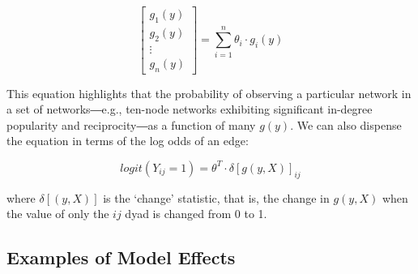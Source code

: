 \documentclass[
  letterpaper,
  DIV=11,
  numbers=noendperiod]{scrartcl}
\begin{document}
\begin{equation}
  [\theta_{1}, \theta_{2}, ..., \theta_{n}]\begin{bmatrix}
           g_{1}(y) \\
           g_{2}(y) \\
           \vdots \\
           g_{n}(y)
        \end{bmatrix}
        = \sum_{i=1}^{n} \theta_{i} \cdot g_{i}(y)
  \end{equation}

This equation highlights that the probability of observing a particular
network in a set of networks―e.g., ten-node networks exhibiting
significant in-degree popularity and reciprocity―as a function of many
\(g(y)\). We can also dispense the equation in terms of the log odds of
an edge:

\begin{equation}
logit(Y_{ij} = 1) = \theta^{T} \cdot \delta[g(y, X)]_{ij}
\end{equation}

where \(\delta[(y, X)]\) is the `change' statistic, that is, the change
in \(g(y,X)\) when the value of only the \(ij\) dyad is changed from 0
to 1.

\subsection{Examples of Model Effects}\label{examples-of-model-effects}
\end{document}
